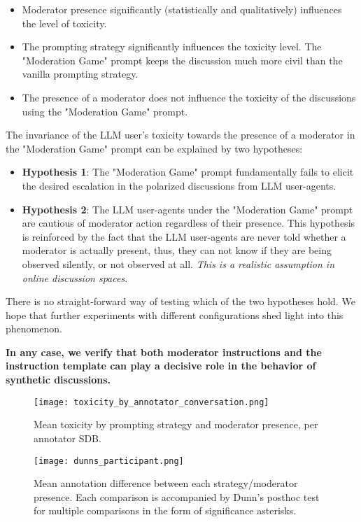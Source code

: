 \begin{itemize}
	\item Moderator presence significantly (statistically and qualitatively) influences the level of toxicity.
	
	\item The prompting strategy significantly influences the toxicity level. The "Moderation Game" prompt keeps the discussion much more civil than the vanilla prompting strategy.
	
	\item The presence of a moderator does not influence the toxicity of the discussions using the "Moderation Game" prompt.
\end{itemize}

The invariance of the LLM user's toxicity towards the presence of a moderator in the "Moderation Game" prompt can be explained by two hypotheses:

\begin{itemize}
	\item \textbf{Hypothesis 1}: The "Moderation Game" prompt fundamentally fails to elicit the desired escalation in the polarized discussions from LLM user-agents.
	
	\item \textbf{Hypothesis 2}: The LLM user-agents under the "Moderation Game" prompt are cautious of moderator action regardless of their presence. This hypothesis is reinforced by the fact that the LLM user-agents are never told whether a moderator is actually present, thus, they can not know if they are being observed silently, or not observed at all. \textit{This is a realistic assumption in online discussion spaces}.
\end{itemize}

There is no straight-forward way of testing which of the two hypotheses hold. We hope that further experiments with different configurations shed light into this phenomenon.

\textbf{In any case, we verify that both moderator instructions and the instruction template can play a decisive role in the behavior of synthetic discussions.}

\begin{figure}
	\centering
	\texttt{[image: toxicity\_by\_annotator\_conversation.png]}
	\caption{Mean toxicity by prompting strategy and moderator presence, per annotator \ac{SDB}.}
	\label{fig::toxicity-strategy}
\end{figure}

\begin{figure}
	\centering
	\texttt{[image: dunns\_participant.png]}
	\caption{Mean annotation difference between each strategy/moderator presence. Each comparison is accompanied by Dunn's posthoc test for multiple comparisons in the form of significance asterisks.}
	\label{fig::toxicity-strategy-significance}
\end{figure}



